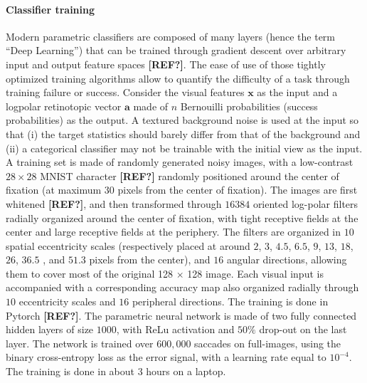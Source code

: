 \paragraph{Classifier training}
Modern parametric classifiers are composed of many layers (hence the term ``Deep Learning'') that can be trained through gradient descent over arbitrary input and output feature spaces {\bf [REF?]}. The ease of use of those tightly optimized training algorithms allow to quantify the difficulty of a task through training failure or success. Consider the visual features $\boldsymbol{x}$ as the input and a logpolar retinotopic vector $\boldsymbol{a}$ made of $n$ Bernouilli probabilities (success probabilities) as the output. A textured background noise is used at the input so that (i) the target statistics should barely differ from that of the background and (ii) a categorical classifier may not be trainable with the initial view as the input. A training set is made of randomly generated noisy images, with a low-contrast $28\times 28$ MNIST character  {\bf [REF?]} randomly positioned around the center of fixation (at maximum $30$ pixels from the center of fixation). The images are first whitened {\bf [REF?]}, and then transformed through $16384$ oriented log-polar filters radially organized around the center of fixation, with tight receptive fields at the center and large receptive fields at the periphery. The filters are organized in $10$ spatial eccentricity scales (respectively placed at around $2$, $3$, $4.5$, $6.5$, $9$, $13$, $18$, $26$, $36.5$ , and $51.3$ pixels from the center), and $16$ angular directions, allowing them to cover most of the original 128 $\times$ 128 image. Each visual input is accompanied with a corresponding accuracy map also organized radially through $10$ eccentricity scales and $16$ peripheral directions. The training is done in Pytorch {\bf [REF?]}. The parametric neural network is made of two fully connected hidden layers of size $1000$, with ReLu activation and $50 \%$ drop-out on the last layer. The network is trained over $600,000$ saccades on full-images, using the binary cross-entropy loss as the error signal, with a learning rate equal to $10^{-4}$. The training is done in about 3 hours on a laptop.


